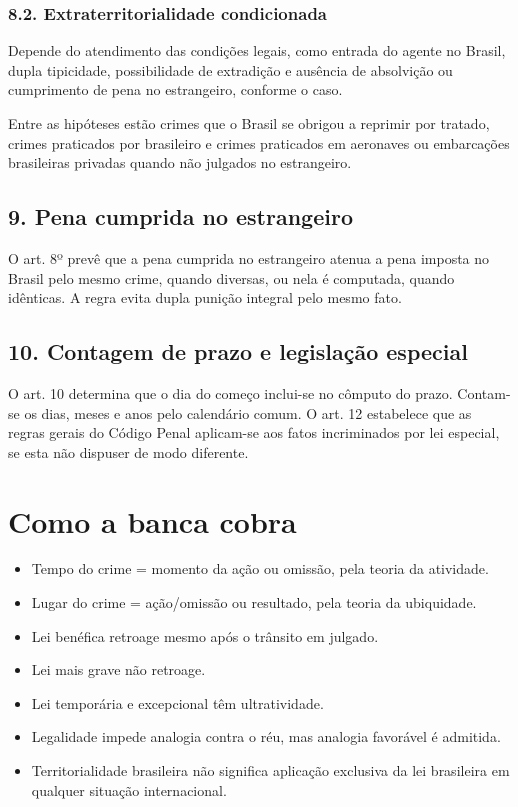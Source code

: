 \documentclass[11pt,a4paper]{article}
\begin{document}
\subsubsection*{8.2. Extraterritorialidade condicionada}

Depende do atendimento das condições legais, como entrada do agente no Brasil, dupla tipicidade, possibilidade de extradição e ausência de absolvição ou cumprimento de pena no estrangeiro, conforme o caso.

Entre as hipóteses estão crimes que o Brasil se obrigou a reprimir por tratado, crimes praticados por brasileiro e crimes praticados em aeronaves ou embarcações brasileiras privadas quando não julgados no estrangeiro.

\subsection*{9. Pena cumprida no estrangeiro}

O art. 8º prevê que a pena cumprida no estrangeiro atenua a pena imposta no Brasil pelo mesmo crime, quando diversas, ou nela é computada, quando idênticas. A regra evita dupla punição integral pelo mesmo fato.

\subsection*{10. Contagem de prazo e legislação especial}

O art. 10 determina que o dia do começo inclui-se no cômputo do prazo. Contam- se os dias, meses e anos pelo calendário comum. O art. 12 estabelece que as regras gerais do Código Penal aplicam-se aos fatos incriminados por lei especial, se esta não dispuser de modo diferente.

\section*{Como a banca cobra}

\begin{itemize}
  \item Tempo do crime = momento da ação ou omissão, pela teoria da atividade.
  \item Lugar do crime = ação/omissão ou resultado, pela teoria da ubiquidade.
  \item Lei benéfica retroage mesmo após o trânsito em julgado.
  \item Lei mais grave não retroage.
  \item Lei temporária e excepcional têm ultratividade.
  \item Legalidade impede analogia contra o réu, mas analogia favorável é admitida.
  \item Territorialidade brasileira não significa aplicação exclusiva da lei brasileira em qualquer situação internacional.
\end{itemize}
\end{document}
